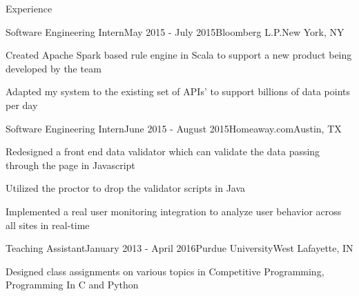 \documentclass{resume} %
\begin{document}
\begin{rSection}{Experience}

\begin{rSubsection}{Software Engineering Intern}{May 2015 - July 2015}{Bloomberg L.P.}{New York, NY}
\item Created Apache Spark based rule engine in Scala to support a new product being developed by the team
\item Adapted my system to the existing set of APIs'  to support billions of data points per day
\end{rSubsection}

\begin{rSubsection}{Software Engineering Intern}{June 2015 - August 2015}{Homeaway.com}{Austin, TX}
\item Redesigned a front end data validator which can validate the data passing through the page in Javascript
\item Utilized the proctor to drop the validator scripts  in Java
\item Implemented a real user monitoring integration to analyze user behavior across all sites in real-time  
\end{rSubsection}

\begin{rSubsection}{Teaching Assistant}{January 2013 - April 2016}{Purdue University}{West Lafayette, IN}
\item Designed class assignments on various topics in Competitive Programming, Programming In C and  Python
\end{rSubsection}


\end{rSection}


\end{document}
